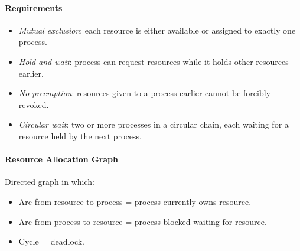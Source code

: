 \documentclass[twocolumn,english]{article}
\begin{document}
\paragraph{Requirements}
\begin{itemize}
\item \emph{Mutual exclusion}: each resource is either available or assigned
to exactly one process.
\item \emph{Hold and wait}: process can request resources while it holds
other resources earlier.
\item \emph{No preemption}: resources given to a process earlier cannot
be forcibly revoked.
\item \emph{Circular wait}: two or more processes in a circular chain, each
waiting for a resource held by the next process.
\end{itemize}

\paragraph{Resource Allocation Graph}

Directed graph in which:
\begin{itemize}
\item Arc from resource to process = process currently owns resource.
\item Arc from process to resource = process blocked waiting for resource.
\item Cycle = deadlock.
\end{itemize}
\end{document}

